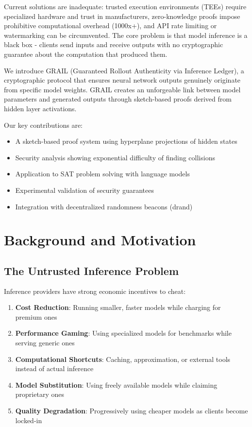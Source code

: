 \documentclass[11pt,a4paper]{article}
\begin{document}
Current solutions are inadequate: trusted execution environments (TEEs) require specialized hardware and trust in manufacturers, zero-knowledge proofs impose prohibitive computational overhead (1000x+), and API rate limiting or watermarking can be circumvented. The core problem is that model inference is a black box - clients send inputs and receive outputs with no cryptographic guarantee about the computation that produced them.

We introduce GRAIL (Guaranteed Rollout Authenticity via Inference Ledger), a cryptographic protocol that ensures neural network outputs genuinely originate from specific model weights. GRAIL creates an unforgeable link between model parameters and generated outputs through sketch-based proofs derived from hidden layer activations.

Our key contributions are:
\begin{itemize}
    \item A sketch-based proof system using hyperplane projections of hidden states
    \item Security analysis showing exponential difficulty of finding collisions
    \item Application to SAT problem solving with language models
    \item Experimental validation of security guarantees
    \item Integration with decentralized randomness beacons (drand)
\end{itemize}

\section{Background and Motivation}

\subsection{The Untrusted Inference Problem}

Inference providers have strong economic incentives to cheat:
\begin{enumerate}
    \item \textbf{Cost Reduction}: Running smaller, faster models while charging for premium ones
    \item \textbf{Performance Gaming}: Using specialized models for benchmarks while serving generic ones
    \item \textbf{Computational Shortcuts}: Caching, approximation, or external tools instead of actual inference
    \item \textbf{Model Substitution}: Using freely available models while claiming proprietary ones
    \item \textbf{Quality Degradation}: Progressively using cheaper models as clients become locked-in
\end{enumerate}
\end{document}

